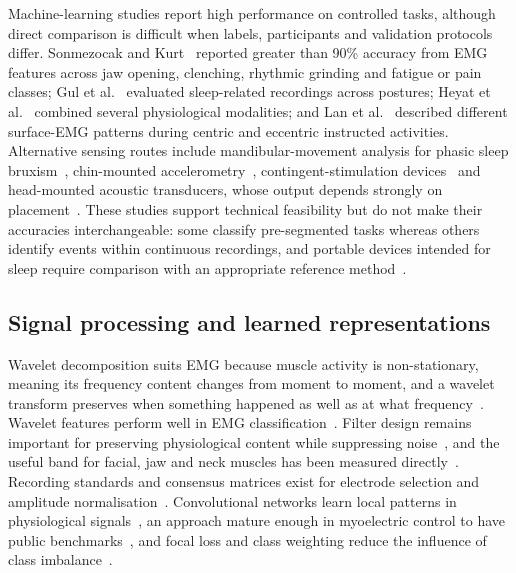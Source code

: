 \documentclass[pdflatex,sn-nature,iicol]{sn-jnl}
\begin{document}
Machine-learning studies report high performance on controlled tasks, although direct comparison is difficult when labels, participants and validation protocols differ. Sonmezocak and Kurt~\cite{sonmezocak2021detection} reported greater than 90\% accuracy from EMG features across jaw opening, clenching, rhythmic grinding and fatigue or pain classes; Gul et al.~\cite{gul2024advanced} evaluated sleep-related recordings across postures; Heyat et al.~\cite{heyat2020computational} combined several physiological modalities; and Lan et al.~\cite{lan2022comparative} described different surface-EMG patterns during centric and eccentric instructed activities. Alternative sensing routes include mandibular-movement analysis for phasic sleep bruxism~\cite{martinot2021artificial}, chin-mounted accelerometry~\cite{patwa2017bruxism}, contingent-stimulation devices~\cite{haugland2020automatic} and head-mounted acoustic transducers, whose output depends strongly on placement~\cite{romano2024wearable}. These studies support technical feasibility but do not make their accuracies interchangeable: some classify pre-segmented tasks whereas others identify events within continuous recordings, and portable devices intended for sleep require comparison with an appropriate reference method~\cite{cidverdejo2024instrumental}.

\subsection{Signal processing and learned representations}

Wavelet decomposition suits EMG because muscle activity is non-stationary, meaning its frequency content changes from moment to moment, and a wavelet transform preserves when something happened as well as at what frequency~\cite{mallat1989theory,daubechies1992ten,englehart2003robust}. Wavelet features perform well in EMG classification~\cite{phinyomark2012feature,bharathi2025unveiling}. Filter design remains important for preserving physiological content while suppressing noise~\cite{chowdhury2013surface,deluca2010filtering,clancy2002sampling,merletti2020tutorial,boyer2023reducing}, and the useful band for facial, jaw and neck muscles has been measured directly~\cite{vanboxtel2001optimal}. Recording standards and consensus matrices exist for electrode selection and amplitude normalisation~\cite{isek1999standards,hermens2000development,besomi2019consensus,besomi2020consensus,merletti2019tutorial,deluca1997use}. Convolutional networks learn local patterns in physiological signals~\cite{faust2018deep,craik2019deep,tsinganos2019improved,rim2020deep,kiranyaz20211d,ismailfawaz2019deep}, an approach mature enough in myoelectric control to have public benchmarks~\cite{atzori2014electromyography,atzori2016deep,coteallard2019deep,jiang2012myoelectric,phinyomark2018emg,wei2019multistream}, and focal loss and class weighting reduce the influence of class imbalance~\cite{lin2017focal,johnson2019survey}.
\end{document}
